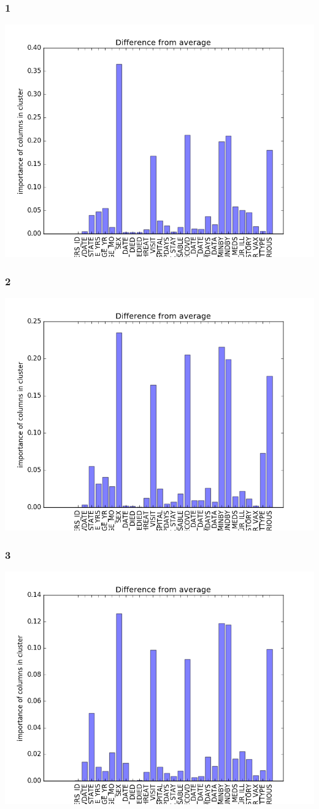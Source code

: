 \documentclass[11pt]{article}
\begin{document}
\subsubsection{1}
\label{sec:orgheadline3}
\includegraphics[width=.9\linewidth]{./cluster-weight-1.png}
\subsubsection{2}
\label{sec:orgheadline4}
\includegraphics[width=.9\linewidth]{./cluster-weight-2.png}
\subsubsection{3}
\label{sec:orgheadline5}
\includegraphics[width=.9\linewidth]{./cluster-weight-3.png}
\end{document}
